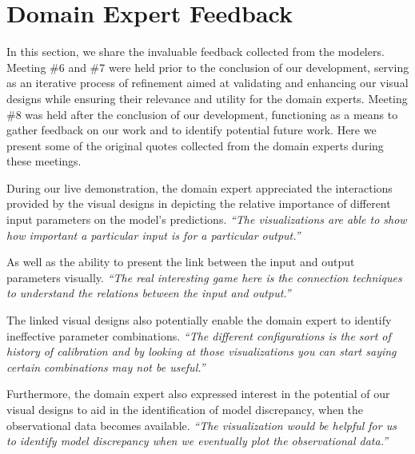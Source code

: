 \section{Domain Expert Feedback}
\label{sec:feedback}
In this section, we share the invaluable feedback collected from the modelers. 
Meeting \#6 and \#7 were held prior to the conclusion of our development, serving as an iterative process of refinement aimed at validating and enhancing our visual designs while ensuring their relevance and utility for the domain experts.
Meeting \#8 was held after the conclusion of our development, functioning as a means to gather feedback on our work and to identify potential future work.
Here we present some of the original quotes collected from the domain experts during these meetings.



During our live demonstration, the domain expert appreciated the interactions provided by the visual designs in depicting the relative importance of different input parameters on the model's predictions.
\textit{``The visualizations are able to show how important a particular input is for a particular output.''
    }

As well as the ability to present the link between the input and output parameters visually.
\textit{``The real interesting game here is the connection techniques to understand the relations between the input and output.''
}

The linked visual designs also potentially enable the domain expert to identify ineffective parameter combinations.
\textit{``The different configurations is the sort of history of calibration and by looking at those visualizations you can start saying certain combinations may not be useful.''
}

Furthermore, the domain expert also expressed interest in the potential of our visual designs to aid in the identification of model discrepancy, when the observational data becomes available.
\textit{``The visualization would be helpful for us to identify model discrepancy when we eventually plot the observational data.''
}


